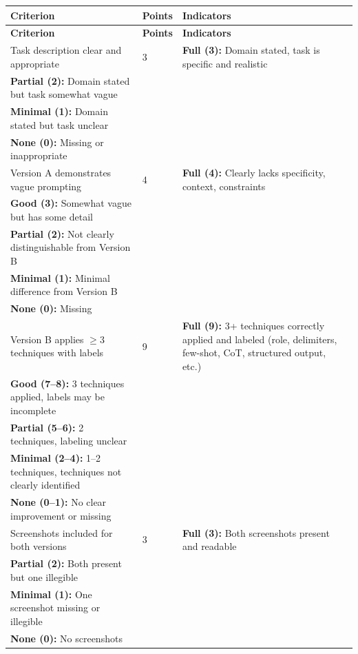 \documentclass[11pt]{article}
\begin{document}
\begin{longtable}{|p{5cm}|p{2cm}|p{8cm}|}
\hline
\textbf{Criterion} & \textbf{Points} & \textbf{Indicators} \\
\hline
\endfirsthead
\hline
\textbf{Criterion} & \textbf{Points} & \textbf{Indicators} \\
\hline
\endhead

Task description clear and appropriate & 3 & 
\textbf{Full (3):} Domain stated, task is specific and realistic \\
\textbf{Partial (2):} Domain stated but task somewhat vague \\
\textbf{Minimal (1):} Domain stated but task unclear \\
\textbf{None (0):} Missing or inappropriate \\
\hline

Version A demonstrates vague prompting & 4 & 
\textbf{Full (4):} Clearly lacks specificity, context, constraints \\
\textbf{Good (3):} Somewhat vague but has some detail \\
\textbf{Partial (2):} Not clearly distinguishable from Version B \\
\textbf{Minimal (1):} Minimal difference from Version B \\
\textbf{None (0):} Missing \\
\hline

Version B applies $\geq$3 techniques with labels & 9 & 
\textbf{Full (9):} 3+ techniques correctly applied and labeled (role, delimiters, few-shot, CoT, structured output, etc.) \\
\textbf{Good (7--8):} 3 techniques applied, labels may be incomplete \\
\textbf{Partial (5--6):} 2 techniques, labeling unclear \\
\textbf{Minimal (2--4):} 1--2 techniques, techniques not clearly identified \\
\textbf{None (0--1):} No clear improvement or missing \\
\hline

Screenshots included for both versions & 3 & 
\textbf{Full (3):} Both screenshots present and readable \\
\textbf{Partial (2):} Both present but one illegible \\
\textbf{Minimal (1):} One screenshot missing or illegible \\
\textbf{None (0):} No screenshots \\
\hline


\end{longtable}
\end{document}
